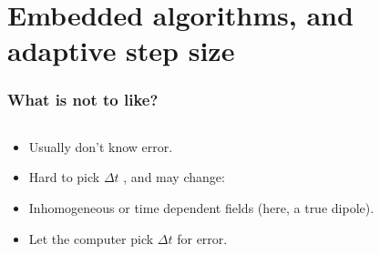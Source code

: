 \documentclass{beamer}
\newif\ifdraft
\begin{document}
\ifdraft
    \section{Embedded algorithms, and adaptive step size 15 min}
\else
    \section{Embedded algorithms, and adaptive step size}
\fi


\begin{frame}
\frametitle{What is not to like?}

\begin{columns}
\begin{column}{0.5\linewidth}
\begin{itemize}
\item <2-> Usually don't know error.

\item <2-> Hard to pick $\Delta t$ , and may change:

\item <3-> Inhomogeneous or time dependent fields (here, a true dipole).

\item <4-> Let the computer pick $\Delta t$ for error.

\end{itemize}
\end{column}
\begin{column}{0.5\linewidth}

\end{column}
\end{columns}
\end{frame}
\end{document}
